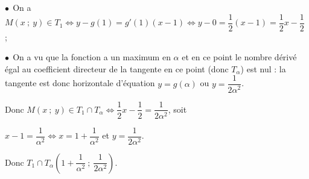 \begin{enumerate}
$\bullet~~$On a $M(x~;~y) \in T_1 \iff y - g(1) = g'(1)(x - 1) \iff y - 0 = \dfrac12(x - 1) = \dfrac12 x - \dfrac12$ ;

$\bullet~~$On a vu que la fonction a un maximum en $\alpha$ et en ce point le nombre dérivé égal au coefficient directeur de la tangente en ce point (donc $T_{\alpha}$) est nul : la tangente est donc horizontale d'équation $y = g(\alpha)$ ou $y = \dfrac{1}{2\alpha^2}$. 

Donc $M(x~;~y) \in T_1 \cap T_{\alpha} \iff \dfrac12 x - \dfrac12 = \dfrac{1}{2\alpha^2}$, soit 

$x - 1 = \dfrac{1}{\alpha^2} \iff x = 1 + \dfrac{1}{\alpha^2}$ et $y = \dfrac{1}{2\alpha^2}$.

Donc $T_1 \cap T_{\alpha}\left(1 + \dfrac{1}{\alpha^2}~;~\dfrac{1}{2\alpha^2}\right)$.
\end{enumerate}

\bigskip

